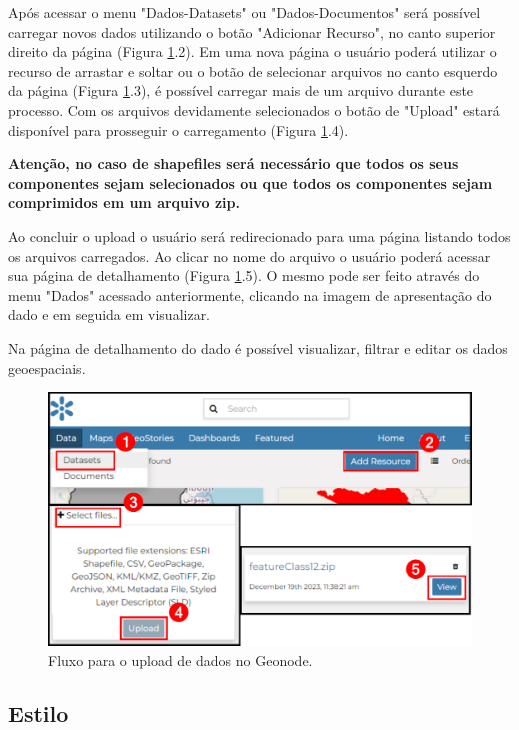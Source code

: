 \documentclass[12pt]{article}
\begin{document}
Após acessar o menu "Dados-Datasets" ou "Dados-Documentos" será possível
carregar novos dados utilizando o botão "Adicionar Recurso", no canto superior
direito da página (Figura \ref{fig:upload}.2). Em uma nova página o usuário
poderá utilizar o recurso de arrastar e soltar ou o botão de selecionar
arquivos no canto esquerdo da página (Figura \ref{fig:upload}.3), é possível
carregar mais de um arquivo durante este processo. Com os arquivos devidamente
selecionados o botão de "Upload" estará disponível para prosseguir o
carregamento (Figura \ref{fig:upload}.4). 

\textbf{Atenção, no caso de shapefiles será necessário que todos os seus
componentes sejam selecionados ou que todos os componentes sejam comprimidos em
um arquivo zip.}

Ao concluir o upload o usuário será redirecionado para uma página listando
todos os arquivos carregados. Ao clicar no nome do arquivo o usuário poderá
acessar sua página de detalhamento (Figura \ref{fig:upload}.5). O mesmo pode
ser feito através do menu "Dados" acessado anteriormente, clicando na imagem de
apresentação do dado e em seguida em visualizar.

Na página de detalhamento do dado é possível visualizar, filtrar e editar os
dados geoespaciais.

\begin{figure}[h]
  \centering
  \includegraphics[width=\textwidth, keepaspectratio]{img/upload.pdf}
  \caption{Fluxo para o upload de dados no Geonode.}
  \label{fig:upload}
\end{figure}

\subsection{Estilo}
\end{document}
